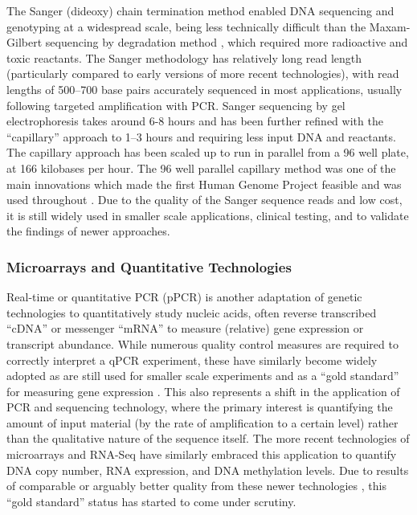 The Sanger (dideoxy) chain termination method \citep{Sanger1975} enabled DNA sequencing and genotyping at a widespread scale, being less technically difficult than the Maxam-Gilbert sequencing by degradation method \citep{Gilbert1973, Maxam1977}, which required more radioactive and toxic reactants. The Sanger methodology has relatively long read length (particularly compared to early versions of more recent technologies), with read lengths of 500--700 base pairs accurately sequenced in most applications, usually following targeted amplification with PCR. Sanger sequencing by gel electrophoresis takes around 6-8 hours and has been further refined with the ``capillary'' approach to 1--3 hours and requiring less input DNA and reactants. The capillary approach has been scaled up to run in parallel from a 96 well plate, at 166 kilobases per hour. The 96 well parallel capillary method was one of the main innovations which made the first Human Genome Project feasible and was used throughout \citep{Lander2001}. Due to the quality of the Sanger sequence reads and low cost, it is still widely used in smaller scale applications, clinical testing, and to validate the findings of newer approaches.


\subsubsection{Microarrays and Quantitative Technologies}
Real-time or quantitative PCR (pPCR) is another adaptation of genetic technologies to quantitatively study nucleic acids, often reverse transcribed ``cDNA'' or messenger ``mRNA'' to measure (relative) gene expression or transcript abundance. While numerous quality control measures are required to correctly interpret a qPCR experiment, these have similarly become widely adopted as are still used for smaller scale experiments and as a ``gold standard'' for measuring gene expression \citep{Adamski2014}. This also represents a shift in the application of PCR and sequencing technology, where the primary interest is quantifying the amount of input material (by the rate of amplification to a certain level) rather than the qualitative nature of the sequence itself. The more recent technologies of microarrays and RNA-Seq have similarly embraced this application to quantify DNA copy number, RNA expression, and DNA methylation levels. Due to results of comparable or arguably better quality from these newer technologies \citep{Robin2016, Beck2016, McCourt2013, Git2010}, this ``gold standard'' status has started to come under scrutiny.

